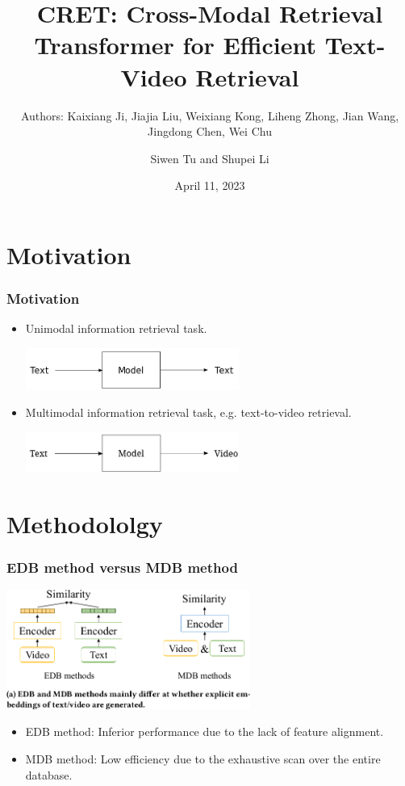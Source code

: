 \documentclass[notes, 10pt, aspectratio=169]{beamer}
\title{CRET: Cross-Modal Retrieval Transformer for Efficient Text-Video Retrieval}
\subtitle{Authors: Kaixiang Ji, Jiajia Liu, Weixiang Kong, Liheng Zhong, Jian Wang, Jingdong Chen, Wei Chu}
\author{Siwen Tu and Shupei Li}
\institute[LIACS]{Leiden Institute of Advanced Computer Science}
\date{April 11, 2023}
\begin{document}
\begin{frame}[plain]
	\titlepage
\end{frame}

\begin{frame}
	\tableofcontents
\end{frame}

\section{Motivation}
\begin{frame}
    \frametitle{Motivation}
    \begin{itemize}
        \item Unimodal information retrieval task.
            \vspace{0.1cm}
            \begin{center}
                \includegraphics[width=7cm]{single-modality.png}
            \end{center}
            \vspace{0.1cm}
        \item Multimodal information retrieval task, e.g. text-to-video retrieval.
            \vspace{0.1cm}
            \begin{center}
                \includegraphics[width=7cm]{multimodality.png}
            \end{center}
    \end{itemize}
\end{frame}

\section{Methodololgy}
\begin{frame}
    \frametitle{EDB method versus MDB method}
    \begin{center}
        \includegraphics[width=8cm]{edb-mdb.png}
    \end{center}
    \begin{itemize}
        \item EDB method: Inferior performance due to the lack of feature alignment.
        \item MDB method: Low efficiency due to the exhaustive scan over the entire database.
    \end{itemize}
\end{frame}
\end{document}
